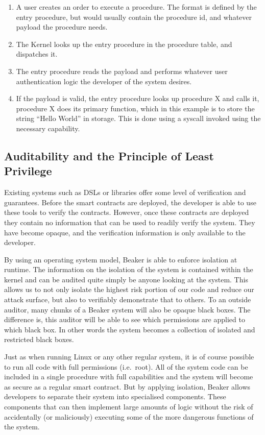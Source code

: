 \documentclass[english,a4paper]{article}
\begin{document}
\begin{enumerate}
\def\labelenumi{\arabic{enumi}.}
\item
  A user creates an order to execute a procedure. The format is defined
  by the entry procedure, but would usually contain the procedure id,
  and whatever payload the procedure needs.
\item
  The Kernel looks up the entry procedure in the procedure table, and
  dispatches it.
\item
  The entry procedure reads the payload and performs whatever user
  authentication logic the developer of the system desires.
\item
  If the payload is valid, the entry procedure looks up procedure X and
  calls it, procedure X does its primary function, which in this example
  is to store the string ``Hello World'' in storage. This is done using
  a syscall invoked using the necessary capability.
\end{enumerate}

\subsection{Auditability and the Principle of Least
Privilege}\label{auditability-and-the-principle-of-least-privilege}
Existing systems such as DSLs or libraries
offer some level of verification and guarantees. Before the smart
contracts are deployed, the developer is able to use these tools to
verify the contracts. However, once these contracts are deployed they
contain no information that can be used to readily verify the system.
They have become opaque, and the verification information is only
available to the developer.

By using an operating system model, Beaker is able to enforce isolation
at runtime. The information on the isolation of the system is contained
within the kernel and can be audited quite simply be anyone looking at
the system. This allows us to not only isolate the highest risk portion
of our code and reduce our attack surface, but also to verifiably
demonstrate that to others. To an outside auditor, many chunks of a
Beaker system will also be opaque black boxes. The difference is, this
auditor will be able to see which permissions are applied to which black
box. In other words the system becomes a collection of isolated and
restricted black boxes.

Just as when running Linux or any other regular system, it is of course
possible to run all code with full permissions (i.e.~root). All of the
system code can be included in a single procedure with full capabilities
and the system will become as secure as a regular smart contract. But by
applying isolation, Beaker allows developers to separate their system
into specialised components. These components that can then implement
large amounts of logic without the risk of accidentally (or maliciously)
executing some of the more dangerous functions of the system.
\end{document}
